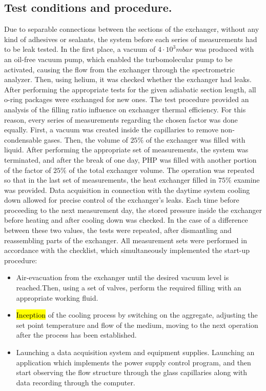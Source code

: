 \documentclass[article]{elsarticle}
\newcommand{\hlc}[2][yellow]{ {\sethlcolor{#1} \hl{#2}} }
\begin{document}
\subsection{Test conditions and procedure.}
Due to separable connections between the sections of the exchanger, without any kind of adhesives or sealants, the system before each series of measurements had to be leak tested. In the first place, a vacuum of $4\cdot 10^3 mbar$ was produced with an oil-free vacuum pump, which enabled the turbomolecular pump to be activated, causing the flow from the exchanger through the spectrometric analyzer. Then, using helium, it was checked whether the exchanger had leaks. After performing the appropriate tests for the given adiabatic section length, all o-ring packages were exchanged for new ones.\newline 
\indent The test procedure provided an analysis of the filling ratio influence on exchanger thermal efficiency. For this reason, every series of measurements regarding the chosen factor was done equally. First, a vacuum was created inside the capillaries to remove non-condensable gases. Then, the volume of $25\%$ of the exchanger was filled with liquid. After performing the appropriate set of measurements, the system was terminated, and after the break of one day, PHP was filled with another portion of the factor of $25\%$ of the total exchanger volume. The operation was repeated so that in the last set of measurements, the heat exchanger filled in $75\%$ examine was provided. Data acquisition in connection with the daytime system cooling down allowed for precise control of the exchanger's leaks. Each time before proceeding to the next measurement day, the stored pressure inside the exchanger before heating and after cooling down was checked. In the case of a difference between these two values, the tests were repeated, after dismantling and reassembling parts of the exchanger.\newline
\indent All measurement sets were performed in accordance with the checklist, which simultaneously implemented the start-up procedure:
\begin{itemize}
\item Air-evacuation from the exchanger until the desired vacuum level is reached.Then, using a set of valves, perform the required filling with an appropriate working fluid.
\item \hlc{Inception} of the cooling process by switching on the aggregate, adjusting the set point temperature and flow of the medium, moving to the next operation after the process has been established.
\item Launching a data acquisition system and equipment supplies. Launching an application which implements the power supply control program, and then start observing the flow structure through the glass capillaries along with data recording through the computer.
\end{itemize}
\end{document}
